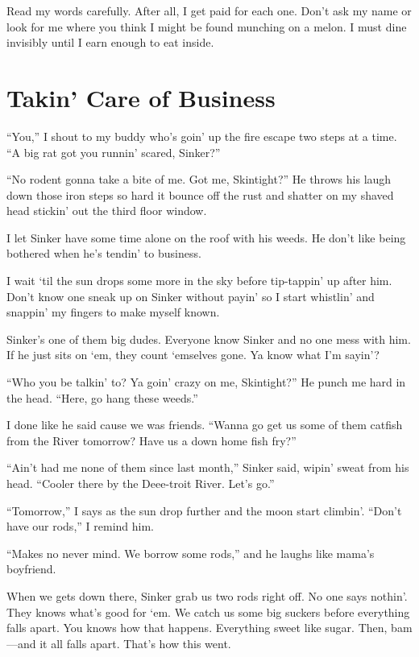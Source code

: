 \documentclass[twoside,10pt]{book}
\begin{document}
Read my words carefully. After all, I get paid for each one. Don't ask
my name or look for me where you think I might be found munching on a
melon. I must dine invisibly until I earn enough to eat inside.



\cleardoublepage
\chapter{Takin' Care of Business}

``You,'' I shout to my buddy who's goin' up the fire escape two steps at
a time. ``A big rat got you runnin' scared, Sinker?''

``No rodent gonna take a bite of me. Got me, Skintight?'' He throws his
laugh down those iron steps so hard it bounce off the rust and shatter
on my shaved head stickin' out the third floor window.

I let Sinker have some time alone on the roof with his weeds. He don't
like being bothered when he's tendin' to business.

I wait `til the sun drops some more in the sky before tip-tappin' up
after him. Don't know one sneak up on Sinker without payin' so I start
whistlin' and snappin' my fingers to make myself known.

Sinker's one of them big dudes. Everyone know Sinker and no one mess
with him. If he just sits on `em, they count `emselves gone. Ya know
what I'm sayin'?

``Who you be talkin' to? Ya goin' crazy on me, Skintight?'' He punch me
hard in the head. ``Here, go hang these weeds.''

I done like he said cause we was friends. ``Wanna go get us some of them
catfish from the River tomorrow? Have us a down home fish fry?''

``Ain't had me none of them since last month,'' Sinker said, wipin'
sweat from his head. ``Cooler there by the Deee-troit River. Let's go.''

``Tomorrow,'' I says as the sun drop further and the moon start
climbin'. ``Don't have our rods,'' I remind him.

``Makes no never mind. We borrow some rods,'' and he laughs like mama's
boyfriend.

When we gets down there, Sinker grab us two rods right off. No one says
nothin'. They knows what's good for `em. We catch us some big suckers
before everything falls apart. You knows how that happens. Everything
sweet like sugar. Then, bam---and it all falls apart. That's how this
went.
\end{document}
